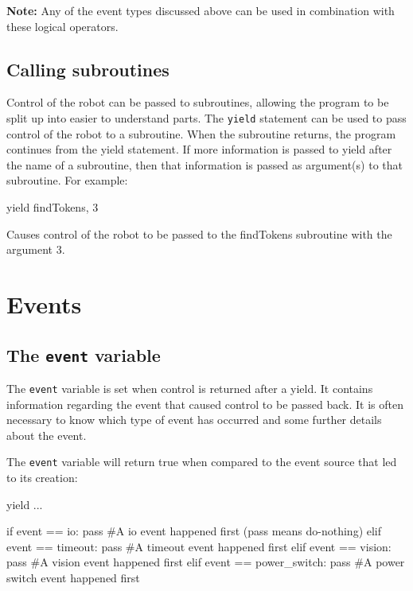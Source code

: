 \documentclass[a4paper, 12pt]{article}
\begin{document}
\noindent\textbf{Note:} Any of the event types discussed above can be used in combination with these logical operators.

\subsection{Calling subroutines}
Control of the robot can be passed to subroutines, allowing the program to be
split up into easier to understand parts.  The \texttt{yield} statement can be
used to pass control of the robot to a subroutine.  When the subroutine returns,
the program continues from the yield statement.  If more information is
passed to yield after the name of a subroutine, then that information is passed
as argument(s) to that subroutine.  For example:

\begin{verbatimtab}
yield findTokens, 3
\end{verbatimtab}

Causes control of the robot to be passed to the findTokens subroutine with the
argument 3.

\section{Events}
\subsection{The \texttt{event} variable}
The \texttt{event} variable is set when control is returned after a
yield. It contains information regarding the event that caused control
to be passed back. It is often necessary to know which type of event has occurred and some further details about the event.
\vspace{12pt}

The \texttt{event} variable will return true when compared to the
event source that led to its creation:

\begin{python}
\begin{verbatimtab}
yield ...

if event == io:
	pass #A io event happened first (pass means do-nothing)
elif event == timeout:
	pass #A timeout event happened first
elif event == vision:
 	pass #A vision event happened first
elif event == power_switch:
	pass #A power switch event happened first
\end{verbatimtab}
\end{python}
\end{document}

